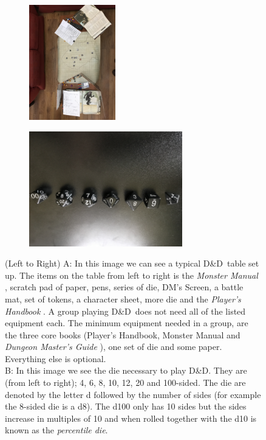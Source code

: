 \documentclass[progress]{cmpreport}
\newcommand{\dnd}{D\&D}
\begin{document}
	\begin{figure}[h]
		\begin{subfigure}{0.5\textwidth}
			\includegraphics[width=1\linewidth, height=5cm, angle=180]{DnD_Live.jpg}
			\label{DnDLive}
		\end{subfigure}
		\begin{subfigure}{0.5\textwidth}
			\includegraphics[width=1\linewidth, height=5cm, angle=180]{DnD_Dice.jpg}
			\label{DnDDice}
		\end{subfigure}
		\caption{(Left to Right) A: In this image we can see a typical \dnd \ table set up. The items on the table from left to right is the \emph{Monster Manual} \citep{MonsterManual}, scratch pad of paper, pens, series of die, DM's Screen, a battle mat, set of tokens, a character sheet, more die and the \emph{Player's Handbook} \citep{PlayerHandbook}. A group playing \dnd \ does not need all of the listed equipment each. The minimum equipment needed in a group, are the three core books (Player's Handbook, Monster Manual and \emph{Dungeon Master's Guide} \citep{DMGuide}), one set of die and some paper. Everything else is optional. \\ B: In this image we see the die necessary to play \dnd. They are (from left to right); 4, 6, 8, 10, 12, 20 and 100-sided. The die are denoted by the letter d followed by the number of sides (for example the 8-sided die is a d8). The d100 only has 10 sides but the sides increase in multiples of 10 and when rolled together with the d10 is known as the \emph{percentile die}.}
		\label{fig:DnDEquipmentExample}
	\end{figure}
\end{document}

